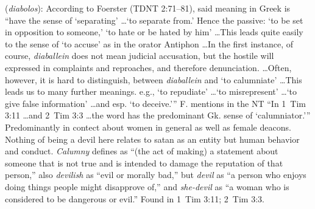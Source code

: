 \item[She-devil,]

(\textit{diabolos}):
According to Foerster (TDNT 2:71--81), said meaning in Greek is ``have the sense of `separating' \ldots `to separate from.' Hence the passive: `to be set in opposition to someone,' `to hate or be hated by him' \ldots This leads quite easily to the sense of `to accuse' as in the orator Antiphon \ldots In the first instance, of course, \emph{diaballein} does not mean judicial accusation, but the hostile will expressed in complaints and reproaches, and therefore denunciation. \ldots Often, however, it is hard to distinguish, between \emph{diaballein} and `to calumniate' \ldots This leads us to many further meanings. e.g., `to repudiate' \ldots `to misrepresent' \ldots `to give false information' \ldots and esp. `to deceive.''' F. mentions in the NT ``In 1~Tim 3:11 \ldots and 2~Tim 3:3 \ldots the word has the predominant Gk. sense of `calumniator.''' Predominantly in contect about women in general as well as female deacons. Nothing of being a devil here relates to satan as an entity but human behavior and conduct. \emph{Calumny} defines as ``(the act of making) a statement about someone that is not true and is intended to damage the reputation of that person,'' also \emph{devilish} as ``evil or morally bad,'' but \emph{devil} as ``a person who enjoys doing things people might disapprove of,'' and \emph{she-devil} as ``a woman who is considered to be dangerous or evil.''
Found in 1~Tim 3:11; 2~Tim 3:3.
